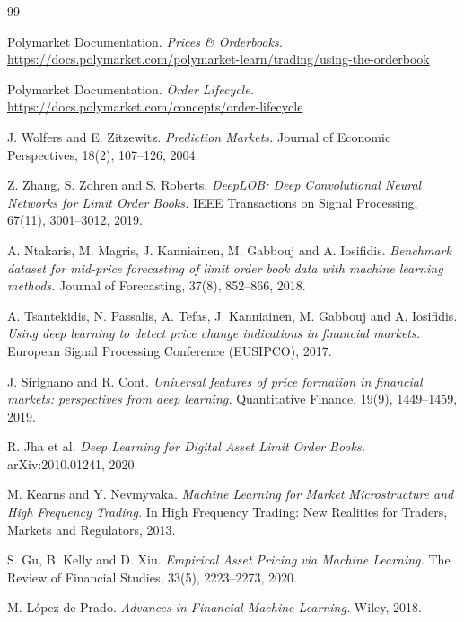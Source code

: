 \documentclass[11pt,a4paper]{article}
\begin{document}
\begin{thebibliography}{99}

Polymarket Documentation. \textit{Prices \& Orderbooks.}
\url{https://docs.polymarket.com/polymarket-learn/trading/using-the-orderbook}

Polymarket Documentation. \textit{Order Lifecycle.}
\url{https://docs.polymarket.com/concepts/order-lifecycle}

J. Wolfers and E. Zitzewitz. \textit{Prediction Markets.}
Journal of Economic Perspectives, 18(2), 107--126, 2004.

Z. Zhang, S. Zohren and S. Roberts.
\textit{DeepLOB: Deep Convolutional Neural Networks for Limit Order Books.}
IEEE Transactions on Signal Processing, 67(11), 3001--3012, 2019.

A. Ntakaris, M. Magris, J. Kanniainen, M. Gabbouj and A. Iosifidis.
\textit{Benchmark dataset for mid-price forecasting of limit order book data with
machine learning methods.} Journal of Forecasting, 37(8), 852--866, 2018.

A. Tsantekidis, N. Passalis, A. Tefas, J. Kanniainen, M. Gabbouj and A. Iosifidis.
\textit{Using deep learning to detect price change indications in financial
markets.} European Signal Processing Conference (EUSIPCO), 2017.

J. Sirignano and R. Cont.
\textit{Universal features of price formation in financial markets: perspectives
from deep learning.} Quantitative Finance, 19(9), 1449--1459, 2019.

R. Jha et al. \textit{Deep Learning for Digital Asset Limit Order Books.}
arXiv:2010.01241, 2020.

M. Kearns and Y. Nevmyvaka.
\textit{Machine Learning for Market Microstructure and High Frequency Trading.}
In High Frequency Trading: New Realities for Traders, Markets and Regulators, 2013.

S. Gu, B. Kelly and D. Xiu.
\textit{Empirical Asset Pricing via Machine Learning.}
The Review of Financial Studies, 33(5), 2223--2273, 2020.

M. López de Prado. \textit{Advances in Financial Machine Learning.}
Wiley, 2018.


\end{thebibliography}
\end{document}

